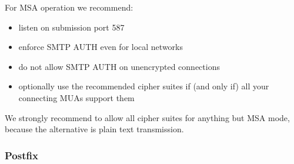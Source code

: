 For MSA operation we recommend:
\begin{itemize}
\item listen on submission port 587
\item enforce SMTP AUTH even for local networks
\item do not allow SMTP AUTH on unencrypted connections
\item optionally use the recommended cipher suites if (and only if) all your connecting MUAs support them
\end{itemize}




We strongly recommend to allow all cipher suites for anything but MSA
mode, because the alternative is plain text transmission.

\subsubsection{Postfix}

